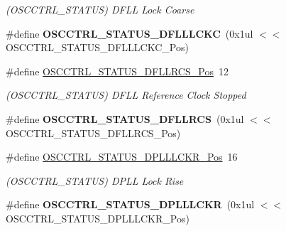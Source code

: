 \begin{DoxyCompactItemize}
\begin{DoxyCompactList}\small\item\em (O\+S\+C\+C\+T\+R\+L\+\_\+\+S\+T\+A\+T\+U\+S) D\+F\+L\+L Lock Coarse \end{DoxyCompactList}\item 
\hypertarget{group___s_a_m_l21___o_s_c_c_t_r_l_ga5e72113694f1557bf1b3c8f574b86d78}{}\#define {\bfseries O\+S\+C\+C\+T\+R\+L\+\_\+\+S\+T\+A\+T\+U\+S\+\_\+\+D\+F\+L\+L\+L\+C\+K\+C}~(0x1ul $<$$<$ O\+S\+C\+C\+T\+R\+L\+\_\+\+S\+T\+A\+T\+U\+S\+\_\+\+D\+F\+L\+L\+L\+C\+K\+C\+\_\+\+Pos)\label{group___s_a_m_l21___o_s_c_c_t_r_l_ga5e72113694f1557bf1b3c8f574b86d78}

\item 
\hypertarget{group___s_a_m_l21___o_s_c_c_t_r_l_ga9d70ec5c52fd967af44a913183821e50}{}\#define \hyperlink{group___s_a_m_l21___o_s_c_c_t_r_l_ga9d70ec5c52fd967af44a913183821e50}{O\+S\+C\+C\+T\+R\+L\+\_\+\+S\+T\+A\+T\+U\+S\+\_\+\+D\+F\+L\+L\+R\+C\+S\+\_\+\+Pos}~12\label{group___s_a_m_l21___o_s_c_c_t_r_l_ga9d70ec5c52fd967af44a913183821e50}

\begin{DoxyCompactList}\small\item\em (O\+S\+C\+C\+T\+R\+L\+\_\+\+S\+T\+A\+T\+U\+S) D\+F\+L\+L Reference Clock Stopped \end{DoxyCompactList}\item 
\hypertarget{group___s_a_m_l21___o_s_c_c_t_r_l_ga919454c2273de2b4b71aaee591751261}{}\#define {\bfseries O\+S\+C\+C\+T\+R\+L\+\_\+\+S\+T\+A\+T\+U\+S\+\_\+\+D\+F\+L\+L\+R\+C\+S}~(0x1ul $<$$<$ O\+S\+C\+C\+T\+R\+L\+\_\+\+S\+T\+A\+T\+U\+S\+\_\+\+D\+F\+L\+L\+R\+C\+S\+\_\+\+Pos)\label{group___s_a_m_l21___o_s_c_c_t_r_l_ga919454c2273de2b4b71aaee591751261}

\item 
\hypertarget{group___s_a_m_l21___o_s_c_c_t_r_l_gae26dcde0dba093d2c86eb042f4bac532}{}\#define \hyperlink{group___s_a_m_l21___o_s_c_c_t_r_l_gae26dcde0dba093d2c86eb042f4bac532}{O\+S\+C\+C\+T\+R\+L\+\_\+\+S\+T\+A\+T\+U\+S\+\_\+\+D\+P\+L\+L\+L\+C\+K\+R\+\_\+\+Pos}~16\label{group___s_a_m_l21___o_s_c_c_t_r_l_gae26dcde0dba093d2c86eb042f4bac532}

\begin{DoxyCompactList}\small\item\em (O\+S\+C\+C\+T\+R\+L\+\_\+\+S\+T\+A\+T\+U\+S) D\+P\+L\+L Lock Rise \end{DoxyCompactList}\item 
\hypertarget{group___s_a_m_l21___o_s_c_c_t_r_l_ga1171a4379fc0cd8d2ae2fa6970f5562d}{}\#define {\bfseries O\+S\+C\+C\+T\+R\+L\+\_\+\+S\+T\+A\+T\+U\+S\+\_\+\+D\+P\+L\+L\+L\+C\+K\+R}~(0x1ul $<$$<$ O\+S\+C\+C\+T\+R\+L\+\_\+\+S\+T\+A\+T\+U\+S\+\_\+\+D\+P\+L\+L\+L\+C\+K\+R\+\_\+\+Pos)\label{group___s_a_m_l21___o_s_c_c_t_r_l_ga1171a4379fc0cd8d2ae2fa6970f5562d}


\end{DoxyCompactItemize}
